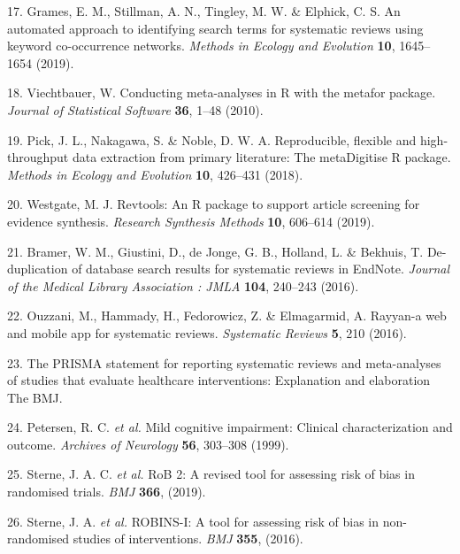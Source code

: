 \documentclass[a4paper, twoside]{templates/ociamthesis}
\begin{document}
\leavevmode\hypertarget{ref-grames2019automated}{}%
17. Grames, E. M., Stillman, A. N., Tingley, M. W. \& Elphick, C. S. An automated approach to identifying search terms for systematic reviews using keyword co-occurrence networks. \emph{Methods in Ecology and Evolution} \textbf{10}, 1645--1654 (2019).

\leavevmode\hypertarget{ref-metaforref}{}%
18. Viechtbauer, W. Conducting meta-analyses in R with the metafor package. \emph{Journal of Statistical Software} \textbf{36}, 1--48 (2010).

\leavevmode\hypertarget{ref-pick2018}{}%
19. Pick, J. L., Nakagawa, S. \& Noble, D. W. A. Reproducible, flexible and high-throughput data extraction from primary literature: The metaDigitise R package. \emph{Methods in Ecology and Evolution} \textbf{10}, 426--431 (2018).

\leavevmode\hypertarget{ref-westgate2019revtools}{}%
20. Westgate, M. J. Revtools: An R package to support article screening for evidence synthesis. \emph{Research Synthesis Methods} \textbf{10}, 606--614 (2019).

\leavevmode\hypertarget{ref-bramer2016}{}%
21. Bramer, W. M., Giustini, D., de Jonge, G. B., Holland, L. \& Bekhuis, T. De-duplication of database search results for systematic reviews in EndNote. \emph{Journal of the Medical Library Association : JMLA} \textbf{104}, 240--243 (2016).

\leavevmode\hypertarget{ref-ouzzani2016}{}%
22. Ouzzani, M., Hammady, H., Fedorowicz, Z. \& Elmagarmid, A. Rayyan-a web and mobile app for systematic reviews. \emph{Systematic Reviews} \textbf{5}, 210 (2016).

\leavevmode\hypertarget{ref-zotero-766}{}%
23. The PRISMA statement for reporting systematic reviews and meta-analyses of studies that evaluate healthcare interventions: Explanation and elaboration \textbar{} The BMJ.

\leavevmode\hypertarget{ref-petersen1999}{}%
24. Petersen, R. C. \emph{et al.} Mild cognitive impairment: Clinical characterization and outcome. \emph{Archives of Neurology} \textbf{56}, 303--308 (1999).

\leavevmode\hypertarget{ref-sterne2019}{}%
25. Sterne, J. A. C. \emph{et al.} RoB 2: A revised tool for assessing risk of bias in randomised trials. \emph{BMJ} \textbf{366}, (2019).

\leavevmode\hypertarget{ref-sterne2016}{}%
26. Sterne, J. A. \emph{et al.} ROBINS-I: A tool for assessing risk of bias in non-randomised studies of interventions. \emph{BMJ} \textbf{355}, (2016).
\end{document}
